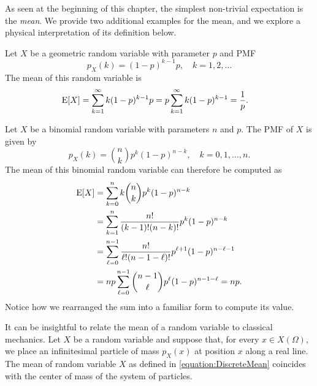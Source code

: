 As seen at the beginning of this chapter, the simplest non-trivial expectation is the \emph{mean}.  
We provide two additional examples for the mean, and we explore a physical interpretation of its definition below.

\begin{example}
Let $X$ be a geometric random variable with parameter $p$ and PMF
\begin{equation*}
p_X (k) = (1-p)^{k-1} p, \quad k = 1, 2, \ldots
\end{equation*}
The mean of this random variable is
\begin{equation*}
\begin{split}
\mathrm{E} [X] &= \sum_{k=1}^{\infty} k (1-p)^{k-1} p
= p \sum_{k=1}^{\infty} k (1-p)^{k-1}
= \frac{1}{p} .
\end{split}
\end{equation*}
\end{example}

\begin{example}
Let $X$ be a binomial random variable with parameters $n$ and $p$.
The PMF of $X$ is given by
\begin{equation*}
p_X (k) = \binom{n}{k} p^k (1-p)^{n-k}, \quad k = 0, 1, \ldots, n.
\end{equation*}
The mean of this binomial random variable can therefore be computed as
\begin{equation*}
\begin{split}
\mathrm{E} [X] &= \sum_{k=0}^n k \binom{n}{k} p^k (1-p)^{n-k} \\
&= \sum_{k=1}^n \frac{n!}{(k-1)!(n-k)!} p^k (1-p)^{n-k} \\
&= \sum_{\ell=0}^{n-1} \frac{n!}{\ell!(n-1-\ell)!} p^{\ell+1} (1-p)^{n-\ell-1} \\
&= n p \sum_{\ell=0}^{n-1} \binom{n-1}{\ell} p^{\ell} (1-p)^{n-1-\ell}
= n p .
\end{split}
\end{equation*}
Notice how we rearranged the sum into a familiar form to compute its value.
\end{example}

It can be insightful to relate the mean of a random variable to classical mechanics.
Let $X$ be a random variable and suppose that, for every $x \in X(\Omega)$, we place an infinitesimal particle of mass $p_X(x)$ at position $x$ along a real line.
The mean of random variable $X$ as defined in \eqref{equation:DiscreteMean} coincides with the center of mass of the system of particles.

